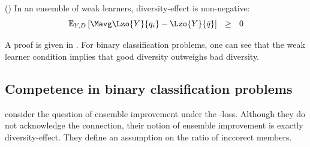 \documentclass[../main.tex]{subfiles}
\begin{document}
\begin{theorem} 
    \label{thm:weak-learner-ensembles-nonnegative}
    (\cite{wood_UnifiedTheoryDiversity_2023}) In an ensemble of weak learners, diversity-effect is non-negative:
$$
\mathbb{E}_{Y,D}\left[ 
\Mavg \Lzo{Y}{q_{i}} - \Lzo{Y}{\bar{q}}
\right] 
~ ~ \geq ~ ~ 0
$$
\end{theorem}

A proof is given in \cite{wood_UnifiedTheoryDiversity_2023}. For binary classification problems, one can see that the weak learner condition implies that good diversity outweighs bad diversity.

\subsection{Competence in binary classification problems}

\citeauthor{theisen_WhenAreEnsembles_2023} consider the question of ensemble improvement under the \zeroone-loss. 
Although they do not acknowledge the connection, their notion of ensemble improvement is exactly diversity-effect.
They define an assumption on the ratio of inccorect members.
\end{document}
